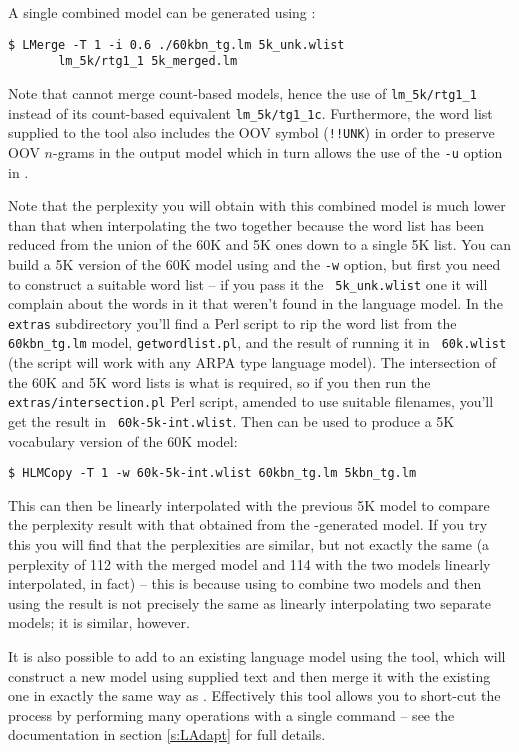A single combined model can be generated using :
\begin{verbatim}
$ LMerge -T 1 -i 0.6 ./60kbn_tg.lm 5k_unk.wlist 
       lm_5k/rtg1_1 5k_merged.lm
\end{verbatim} %
Note that  cannot merge count-based models, hence the
use of \texttt{lm\_5k/rtg1\_1} instead of its count-based equivalent
\texttt{lm\_5k/tg1\_1c}.  Furthermore, the word list supplied to the
tool also includes the OOV symbol (\texttt{!!UNK}) in order to
preserve OOV $n$-grams in the output model which in turn allows the
use of the \texttt{-u} option in .

Note that the perplexity you will obtain with this combined model is
much lower than that when interpolating the two together because the
word list has been reduced from the union of the 60K and 5K ones down
to a single 5K list.  You can build a 5K version of the 60K model
using  and the {\tt -w} option, but first you need to
construct a suitable word list -- if you pass it the {\tt
5k\_unk.wlist} one it will complain about the words in it that weren't
found in the language model.  In the {\tt extras} subdirectory you'll
find a Perl script to rip the word list from the {\tt 60kbn\_tg.lm}
model, {\tt getwordlist.pl}, and the result of running it in {\tt
60k.wlist} (the script will work with any ARPA type language model).
The intersection of the 60K and 5K word lists is what is required, so
if you then run the {\tt extras/intersection.pl} Perl script, amended
to use suitable filenames, you'll get the result in {\tt
60k-5k-int.wlist}.  Then  can be used to produce a 5K
vocabulary version of the 60K model:
\begin{verbatim}
$ HLMCopy -T 1 -w 60k-5k-int.wlist 60kbn_tg.lm 5kbn_tg.lm
\end{verbatim} %
This can then be linearly interpolated with the previous 5K model to
compare the perplexity result with that obtained from the
-generated model.  If you try this you will find that
the perplexities are similar, but not exactly the same (a perplexity
of 112 with the merged model and 114 with the two models linearly
interpolated, in fact) -- this is because using  to
combine two models and then using the result is not precisely the same
as linearly interpolating two separate models; it is similar, however.

It is also possible to add to an existing language model using the
 tool, which will construct a new model using supplied
text and then merge it with the existing one in exactly the same way
as .  Effectively this tool allows you to short-cut the
process by performing many operations with a single command -- see the
documentation in section \ref{s:LAdapt} for full details.



